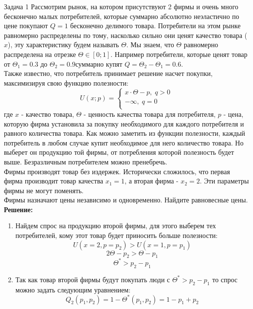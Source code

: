 \begin{mybox}{Задача 1}
    \indent\setlength{\parindent}{1em}\indent\setlength{\parindent}{1em}Рассмотрим рынок, на котором присутствуют 2
    фирмы и очень много бесконечно малых потребителей, которые суммарно абсолютно неэластично по цене покупают $Q=1$
    бесконечно делимого товара. Потребители на этом рынке равномерно распределены по тому, насколько сильно они ценят
    качество товара ($x$), эту характеристику будем называть $\Theta$. Мы знаем, что $\Theta$ равномерно
    распределена на отрезке $\Theta\in [0;1]$. Например потребители, которые ценят товар от $\Theta_1=0.3$ до
    $\Theta_2=0.9$суммарно купят $Q=\Theta_2-\Theta_1=0.6$.\\
    \indent\setlength{\parindent}{1em}Также известно, что потребитель принимает решение насчет покупки, максимизируя
    свою функцию полезности:
    $$U(x;p)=\begin{cases}
          x\cdot\Theta-p,\;q>0 \\
          -\infty,\;q=0 \\
    \end{cases}$$
    где $x$ - качество товара, $\Theta$ - ценность качества товара для потребителя, $p$ - цена, которую фирма
    установила за покупку необходимого для каждого потребителя и равного количества товара. Как можно заметить из
    функции полезности, каждый потребитель в любом случае купит необходимое для него количество товара. Но выберет он
    продукцию той фирмы, от потребления которой полезность будет выше. Безразличным потребителем можно пренебречь.\\
    \indent\setlength{\parindent}{1em}Фирмы производят товар без издержек. Исторически сложилось, что первая фирма
    производит товар качества $x_1=1$, а вторая фирма - $x_2=2$. Эти параметры фирмы не могут поменять.\\
    \indent\setlength{\parindent}{1em}Фирмы назначают цены независимо и одновременно. Найдите равновесные цены.
    \tcblower
    \textbf{Решение:}
    \begin{enumerate}
        \item Найдем спрос на продукцию второй фирмы, для этого выберем тех потребителей, кому этот товар будет
        приносить больше полезности:
        $$U(x=2,p=p_2)>U(x=1,p=p_1)$$
        $$2\Theta-p_2>\Theta-p_1$$
        $$\Theta^*>p_2-p_1$$
        \item Так как товар второй фирмы будут покупать люди с $\Theta^*>p_2-p_1$ то спрос можно задать следующим
        уравнением:
        $$Q_2(p_1,p_2)=1-\Theta^*(p_1,p_2)=1-p_1+p_2$$

\end{enumerate}
\end{mybox}
